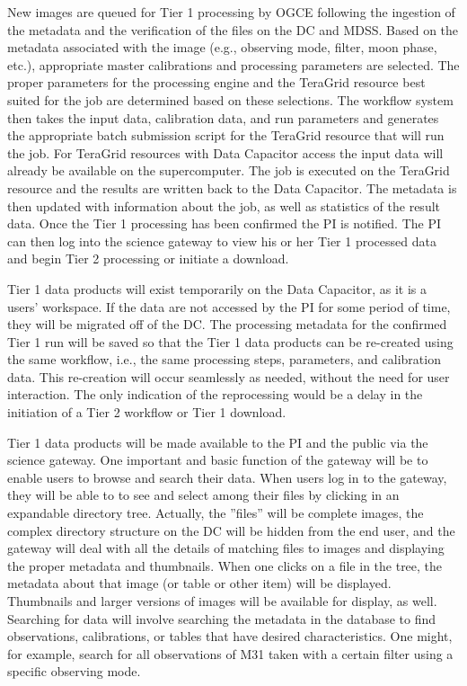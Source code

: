 \documentclass[10pt,conference]{IEEEtran}
\begin{document}
New images are queued for Tier 1 processing by OGCE following the ingestion of the metadata and the verification of the files on the DC and MDSS. 
Based on the metadata associated with the image (e.g., observing mode, filter, moon phase, etc.), appropriate master calibrations and processing parameters are selected. The proper parameters for the processing engine and the TeraGrid resource best suited for the job are determined based on these selections. The workflow system then takes the input data, calibration data, and run parameters and generates the appropriate batch submission script for the TeraGrid resource that will run the job. For TeraGrid resources with Data Capacitor access the input data will already be available on the supercomputer. The job is executed on the TeraGrid resource and the results are written back to the Data Capacitor. The metadata is then updated with information about the job, as well as statistics of the result data. Once the Tier 1 processing has been confirmed the PI is notified. The PI can then log into the science gateway to view his or her Tier 1 processed data and begin Tier 2 processing or initiate a download.

Tier 1 data products will exist temporarily on the Data Capacitor, as it is a users' workspace. If the data are not accessed by the PI for some period of time, they will be migrated off of the DC. The processing metadata for the confirmed Tier 1 run will be saved so that the Tier 1 data products can be re-created using the same workflow, i.e., the same processing steps, parameters, and calibration data. This re-creation will occur seamlessly as needed, without the need for user interaction. The only indication of the reprocessing would be a delay in the initiation of a Tier 2 workflow or Tier 1 download.

Tier 1 data products will be made available to the PI and the public via the science gateway. One important and basic function of the gateway will be to enable users to browse and search their data.  When users log in to the gateway, they will be able to to see and select among their files by clicking in an expandable directory tree. Actually, the ''files'' will be complete images, the complex directory structure on the DC will be hidden from the end user, and the gateway will deal with all the details of matching files to images and displaying the proper metadata and thumbnails. When one clicks on a file in the tree, the metadata about that image (or table or other item) will be displayed. Thumbnails and larger versions of images will be available for display, as well.  
Searching for data will involve searching the metadata in the database to find observations, calibrations, or tables that have desired characteristics. One might, for example, search for all observations of M31 taken with a certain filter using a specific observing mode.
\end{document}

